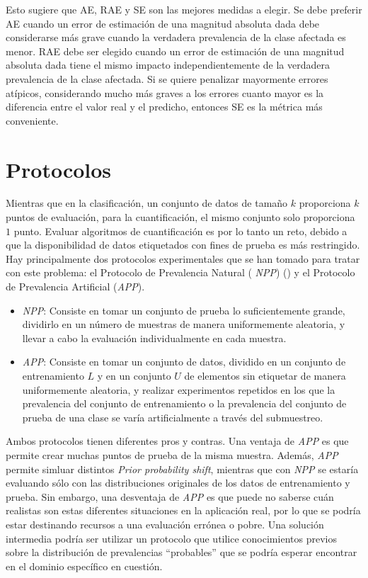 Esto sugiere que AE, RAE y SE son las mejores medidas a elegir. Se debe preferir
AE cuando un error de estimación de una magnitud absoluta dada debe considerarse
más grave cuando la verdadera prevalencia de la clase afectada es menor. RAE
debe ser elegido cuando un error de estimación de una magnitud absoluta dada
tiene el mismo impacto independientemente de la verdadera prevalencia de la
clase afectada. Si se quiere penalizar mayormente errores atípicos, considerando
mucho más graves a los errores cuanto mayor es la diferencia entre el valor real
y el predicho, entonces SE es la métrica más conveniente.

\section{Protocolos}\label{evaluacion:protocolos}

Mientras que en la clasificación, un conjunto de datos de tamaño $k$ proporciona
$k$ puntos de evaluación, para la cuantificación, el mismo conjunto solo
proporciona $1$ punto. Evaluar algoritmos de cuantificación es por lo tanto un
reto, debido a que la disponibilidad de datos etiquetados con fines de prueba es
más restringido. Hay principalmente dos protocolos experimentales que se han
tomado para tratar con este problema: el Protocolo de Prevalencia Natural ({\it
NPP\/}) () y el Protocolo de Prevalencia Artificial ({\it APP\/}).

\begin{itemize}
    \item {\it NPP\/}: Consiste en tomar un conjunto de prueba lo
    suficientemente grande, dividirlo en un número de muestras de manera
    uniformemente aleatoria, y llevar a cabo la evaluación individualmente en
    cada muestra.
    \item {\it APP\/}: Consiste en tomar un conjunto de datos, dividido en un
    conjunto de entrenamiento $L$ y en un conjunto $U$ de elementos sin
    etiquetar de manera uniformemente aleatoria, y realizar experimentos
    repetidos en los que la prevalencia del conjunto de entrenamiento o la
    prevalencia del conjunto de prueba de una clase se varía artificialmente a
    través del submuestreo.
\end{itemize}

Ambos protocolos tienen diferentes pros y contras. Una ventaja de {\it APP\/} es
que permite crear muchas puntos de prueba de la misma muestra. Además, {\it
APP\/} permite simluar distintos {\it Prior probability shift}, mientras que con
{\it NPP\/} se estaría evaluando sólo con las distribuciones originales de los
datos de entrenamiento y prueba. Sin embargo, una desventaja de {\it APP\/} es
que puede no saberse cuán realistas son estas diferentes situaciones en la
aplicación real, por lo que se podría estar destinando recursos a una evaluación
errónea o pobre. Una solución intermedia podría ser utilizar un protocolo que
utilice conocimientos previos sobre la distribución de prevalencias “probables”
que se podría esperar encontrar en el dominio específico en cuestión.
